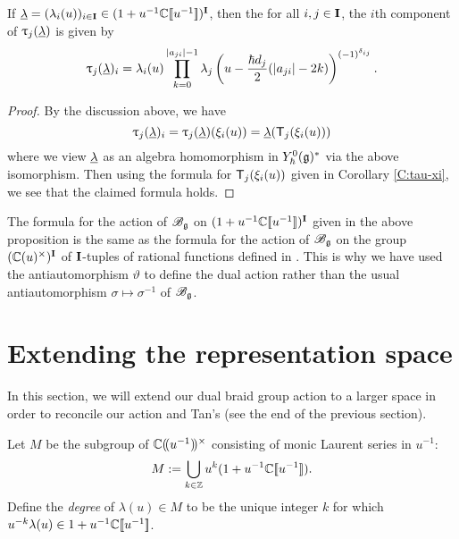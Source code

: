 \begin{proposition}\label{P:Tan-formula}
    If $\ul = (\lambda_i(u))_{i\in\I}\in (1+u^{-1}\C\db{u^{-1}})^\I$, then the for all $i,j\in\I$, the $i$th component of $\braid_j(\ul)$ is given by
    \[\braid_j(\ul)_i = \lambda_i(u)\prod_{k=0}^{\abs{a_{ji}}-1}\lambda_j\left(u-\frac{\hbar d_j}{2}(\abs{a_{ji}}-2k)\right)^{(-1)^{\delta_{ij}}}.\]
\end{proposition}
\begin{proof}
    By the discussion above, we have
    \[\braid_j(\ul)_i = \braid_j(\ul)(\xi_i(u)) = \ul(\mbraid_j(\xi_i(u)))\]
    where we view $\ul$ as an algebra homomorphism in $\Yhg[0]^*$ via the above isomorphism.
    Then using the formula for $\mbraid_j(\xi_i(u))$ given in Corollary \ref{C:tau-xi}, we see that the claimed formula holds.
\end{proof}

The formula for the action of $\Bg$ on $(1+u^{-1}\C\db{u^{-1}})^\I$ given in the above proposition is the same as the formula for the action of $\Bg$ on the group $(\C(u)^\times)^\I$ of $\I$-tuples of rational functions defined in \cite[Prop. 3.1]{tan_braid_2015}.
This is why we have used the antiautomorphism $\vartheta$ to define the dual action rather than the usual antiautomorphism $\sigma\mapsto\sigma^{-1}$ of $\Bg$.


\section{Extending the representation space}

In this section, we will extend our dual braid group action to a larger space in order to reconcile our action and Tan's (see the end of the previous section).

Let $M$ be the subgroup of $\C\dparen{u^{-1}}^\times$ consisting of monic Laurent series in $u^{-1}$:
\[M := \bigcup_{k\in\Z}u^{k}(1+u^{-1}\C\db{u^{-1}}).\]
Define the \emph{degree} of $\lambda(u)\in M$ to be the unique integer $k$ for which $u^{-k}\lambda(u)\in 1+u^{-1}\C\db{u^{-1}}$.

